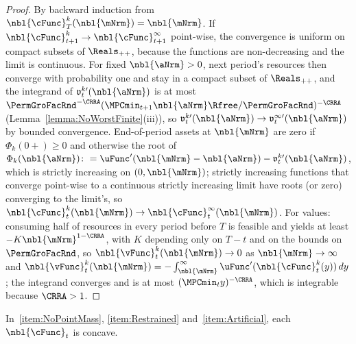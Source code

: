 \documentclass[\econtexRoot/BufferStockTheory]{subfiles}
\begin{document}
\begin{proof}
By backward induction from $\nbl{\cFunc}_{T}^{k}(\nbl{\mNrm})=\nbl{\mNrm}$.
If $\nbl{\cFunc}_{t+1}^{k}\rightarrow\nbl{\cFunc}_{t+1}^{\infty}$ point-wise, the convergence is uniform on compact subsets of $\Reals_{++}$, because the functions are non-decreasing and the limit is continuous.
For fixed $\nbl{\aNrm}>0$, next period's resources then converge with probability one and stay in a compact subset of $\Reals_{++}$, and the integrand of $\mathfrak{v}_{t}^{k\prime}(\nbl{\aNrm})$ is at most $\PermGroFacRnd^{-\CRRA}(\MPCmin_{t+1}\nbl{\aNrm}\Rfree/\PermGroFacRnd)^{-\CRRA}$ (Lemma~\ref{lemma:NoWorstFinite}(iii)), so $\mathfrak{v}_{t}^{k\prime}(\nbl{\aNrm})\rightarrow\mathfrak{v}_{t}^{\infty\prime}(\nbl{\aNrm})$ by bounded convergence.
End-of-period assets at $\nbl{\mNrm}$ are zero if $\Phi_{k}(0+)\geq 0$ and otherwise the root of $\Phi_{k}(\nbl{\aNrm})\colon=\uFunc^{\prime}(\nbl{\mNrm}-\nbl{\aNrm})-\mathfrak{v}_{t}^{k\prime}(\nbl{\aNrm})$, which is strictly increasing on $(0,\nbl{\mNrm})$; strictly increasing functions that converge point-wise to a continuous strictly increasing limit have roots (or zero) converging to the limit's, so $\nbl{\cFunc}_{t}^{k}(\nbl{\mNrm})\rightarrow\nbl{\cFunc}_{t}^{\infty}(\nbl{\mNrm})$.
For values: consuming half of resources in every period before $T$ is feasible and yields at least $-K\nbl{\mNrm}^{1-\CRRA}$, with $K$ depending only on $T-t$ and on the bounds on $\PermGroFacRnd$, so $\nbl{\vFunc}_{t}^{k}(\nbl{\mNrm})\rightarrow 0$ as $\nbl{\mNrm}\rightarrow\infty$ and $\nbl{\vFunc}_{t}^{k}(\nbl{\mNrm})=-\int_{\nbl{\mNrm}}^{\infty}\uFunc^{\prime}(\nbl{\cFunc}_{t}^{k}(y))\,dy$; the integrand converges and is at most $(\MPCmin_{t}y)^{-\CRRA}$, which is integrable because $\CRRA>1$.
\end{proof}

\begin{corollary}\label{coro:ConcaveNoWorst}
In~\ref{item:NoPointMass}, \ref{item:Restrained} and~\ref{item:Artificial}, each $\nbl{\cFunc}_{t}$ is concave.
\end{corollary}
\end{document}
